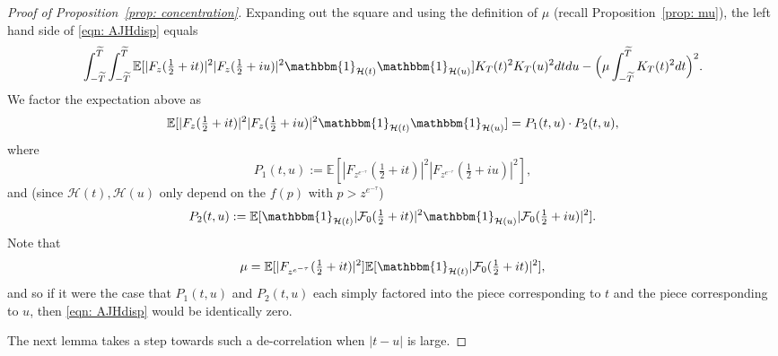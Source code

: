 \documentclass[12pt, notitlepage]{amsart}
\numberwithin{equation}{section}
\def\E{\mathbb E}
\def\TT{\widetilde{T}}
\theoremstyle{remark}
\theoremstyle{definition}
\theoremstyle{remark}
\numberwithin{equation}{section}
\begin{document}
\begin{proof}[Proof of Proposition~\ref{prop: concentration}] Expanding out the square and using the definition of $\mu$ (recall Proposition~\ref{prop: mu}), the left hand side of \eqref{eqn: AJHdisp} equals
\begin{equation}\label{eqn: double}
  \int_{-\TT}^{\TT}\int_{-\TT}^{\TT}  \E[|F_z(\tfrac 12+it)|^{2} |F_z(\tfrac 12 +iu)|^{2} \mathbbm{1}_{\mathcal{H}(t)}\mathbbm{1}_{\mathcal{H}(u)}]  K_{T}(t)^{2}K_{T}(u)^{2} dt du 
  - \Big( \mu \int_{-\TT}^{\TT} K_T(t)^2 dt \Big)^2.  
\end{equation}
We factor the expectation above as 
\[
\E[ |F_z(\tfrac 12+it)|^{2} |F_z(\tfrac 12+iu)|^{2} \mathbbm{1}_{\mathcal{H}(t)}\mathbbm{1}_{\mathcal{H}(u)}] = P_1(t, u) \cdot P_2(t, u), 
\]
where
\begin{equation}\label{eqn: P_1}
  P_1(t, u) := \E[ |F_{z^{e^{-\tau}}}(\tfrac 12+it)|^{2} |F_{z^{e^{-\tau}}}(\tfrac 12+iu)|^{2} ]  ,
\end{equation}
and (since $\mathcal{H}(t), \mathcal{H}(u)$ only depend on the $f(p)$ with $p > z^{e^{-\tau}}$)
\[
P_2(t, u): = \E[\mathbbm{1}_{\mathcal{H}(t)} |{\mathcal F}_0(\tfrac 12+it)|^2 \mathbbm{1}_{\mathcal{H}(u)} |{\mathcal F}_0(\tfrac 12+iu)|^2]. 
\]
Note that 
$$
\mu = \E[ |F_{z^{e^{-\tau}}}(\tfrac 12+it)|^{2}] \E[\mathbbm{1}_{\mathcal{H}(t)} |{\mathcal F}_0(\tfrac 12+it)|^2], 
$$
and so if it were the case that $P_1(t, u)$ and $P_2(t, u)$ each simply factored into the piece corresponding to $t$ and the piece corresponding to $u$, then \eqref{eqn: AJHdisp} would be identically zero.

The next lemma takes a step towards such a de-correlation when $|t-u|$ is large.  


\end{proof}
\end{document}
